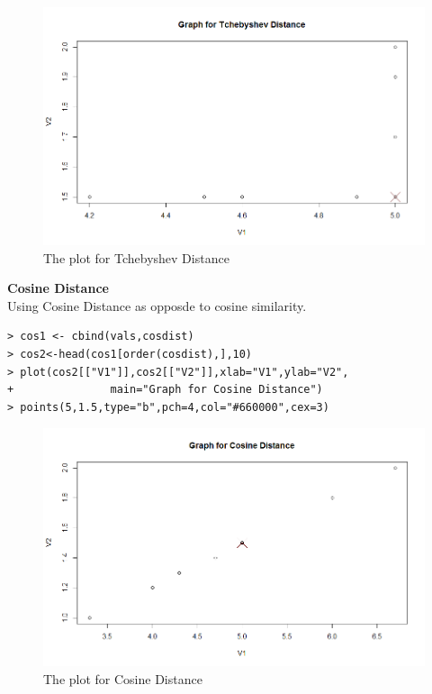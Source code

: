 \documentclass[fontsize=10pt]{scrartcl}
\begin{document}
\begin{enumerate}
\begin{enumerate}
\begin{verbatim}
\end{verbatim}
			\begin{figure}[H]
				\begin{center}
					\includegraphics[scale=.5]{resources/tchebyshev.png}
					\caption{The plot for Tchebyshev Distance}
				\end{center}
			\end{figure}

			\newpage
			\textbf{\large Cosine Distance} \\

				Using Cosine Distance as opposde to cosine similarity.
\begin{verbatim}
> cos1 <- cbind(vals,cosdist)
> cos2<-head(cos1[order(cosdist),],10)
> plot(cos2[["V1"]],cos2[["V2"]],xlab="V1",ylab="V2",
+				main="Graph for Cosine Distance")
> points(5,1.5,type="b",pch=4,col="#660000",cex=3)

\end{verbatim}
			\begin{figure}[H]
				\begin{center}
					\includegraphics[scale=.5]{resources/cosine.png}
					\caption{The plot for Cosine Distance}
				\end{center}
			\end{figure}


\end{enumerate}
\end{enumerate}
\end{document}
